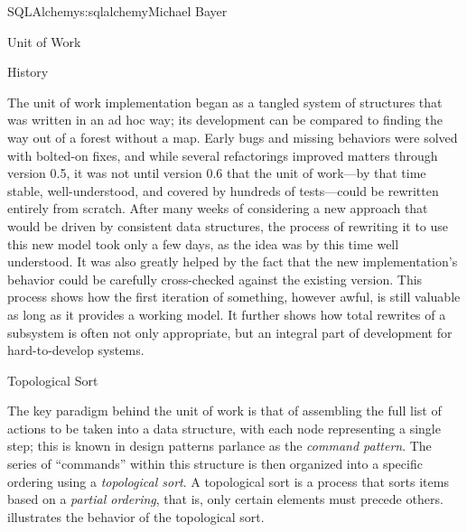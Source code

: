 \begin{aosachapter}{SQLAlchemy}{s:sqlalchemy}{Michael Bayer}
\begin{aosasect1}{Unit of Work}
\begin{aosasect2}{History}

The unit of work implementation began as a tangled system of structures that
was written in an ad hoc way; its development can be compared to finding
the way out of a forest without a map. Early bugs and missing behaviors were
solved with bolted-on fixes, and while several refactorings improved matters
through version 0.5, it was not until version 0.6 that the unit of work---by
that time stable, well-understood, and covered by hundreds of tests---could be
rewritten entirely from scratch.  After many weeks of considering a new
approach that would be driven by consistent data structures, the process of
rewriting it to use this new model took only a few days, as the idea was
by this time well understood.  It was also
greatly helped by the fact that the new implementation's behavior could be
carefully cross-checked against the existing version. This process shows how
the first iteration of something, however awful, is still valuable as long as
it provides a working model.  It further shows how total rewrites of a subsystem
is often not only appropriate, but an integral part of development for
hard-to-develop systems.

\end{aosasect2}

\begin{aosasect2}{Topological Sort}

The key paradigm behind the unit of work is that of assembling the full list of
actions to be taken into a data structure, with each node representing a single step;
this is known in design patterns parlance as the \emph{command pattern}.   The series of
``commands'' within this structure is then organized into a specific ordering
using a \emph{topological sort}.   A topological sort is a process that sorts items based on a \emph{partial ordering},
that is, only certain elements must precede others.   illustrates the
behavior of the topological sort.



\end{aosasect2}
\end{aosasect1}
\end{aosachapter}
